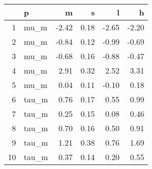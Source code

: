 \begin{table}[ht]
\centering
\begin{tabular}{rlrrrr}
  \hline
 & p & m & s & l & h \\ 
  \hline
1 & mu\_m & -2.42 & 0.18 & -2.65 & -2.20 \\ 
  2 & mu\_m & -0.84 & 0.12 & -0.99 & -0.69 \\ 
  3 & mu\_m & -0.68 & 0.16 & -0.88 & -0.47 \\ 
  4 & mu\_m & 2.91 & 0.32 & 2.52 & 3.31 \\ 
  5 & mu\_m & 0.04 & 0.11 & -0.10 & 0.18 \\ 
  6 & tau\_m & 0.76 & 0.17 & 0.55 & 0.99 \\ 
  7 & tau\_m & 0.25 & 0.15 & 0.08 & 0.46 \\ 
  8 & tau\_m & 0.70 & 0.16 & 0.50 & 0.91 \\ 
  9 & tau\_m & 1.21 & 0.38 & 0.76 & 1.69 \\ 
  10 & tau\_m & 0.37 & 0.14 & 0.20 & 0.55 \\ 
   \hline
\end{tabular}
\label{tab:param}
\end{table}
